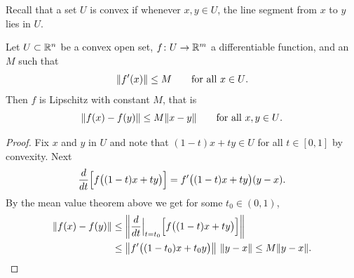 Recall that a set $U$ is convex
if whenever $x,y \in U$, the line segment from
$x$ to $y$ lies in $U$.

\begin{prop} \label{mv:prop:convexlip}
Let $U \subset {\mathbb{R}}^n$ be a convex open set, $f \colon U \to {\mathbb{R}}^m$
a differentiable function, and an $M$ such that
\begin{equation*}
\lVert {f'(x)} \rVert \leq M
\qquad \text{for all $x \in U$.}
\end{equation*}
Then $f$ is Lipschitz with constant $M$, that is
\begin{equation*}
\lVert {f(x)-f(y)} \rVert \leq M \lVert {x-y} \rVert
\qquad
\text{for all $x,y \in U$.}
\end{equation*}
\end{prop}

\begin{proof}
Fix $x$ and $y$ in $U$ and note that
$(1-t)x+ty \in U$ for all $t \in [0,1]$
by convexity.
Next
\begin{equation*}
\frac{d}{dt} \Bigl[f\bigl((1-t)x+ty\bigr)\Bigr]
=
f'\bigl((1-t)x+ty\bigr) (y-x) .
\end{equation*}
By the mean value theorem above we get for
some $t_0 \in (0,1)$,
\begin{equation*}
\begin{split}
\lVert {f(x)-f(y)} \rVert & \leq
\left\lVert {\frac{d}{dt} \Big|_{t=t_0} \Bigl[ f\bigl((1-t)x+ty\bigr) \Bigr] } \right\rVert
\\
& \leq
\left\lVert {f'\bigl((1-t_0)x+t_0y\bigr)} \right\rVert \, \lVert {y-x} \rVert \leq
M \lVert {y-x} \rVert . \qedhere
\end{split}
\end{equation*}
\end{proof}

